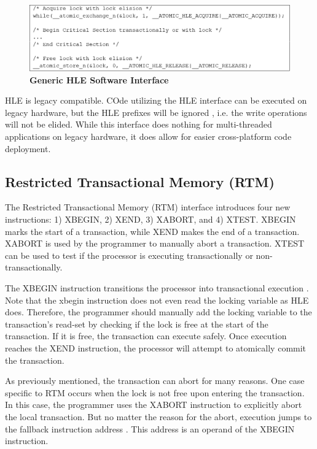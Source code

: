 \documentclass[a4paper]{article}
\begin{document}
\begin{figure}[H]
    \centering
    \graphicspath{ {./figures/} }
    \includegraphics[width=\textwidth,height=\textheight,keepaspectratio]{fig_hleInterface}
    \caption{\textbf{Generic HLE Software Interface}}
    \label{fig:hle_interface}
\end{figure}

\indent HLE is legacy compatible.  COde utilizing the HLE interface can be
executed on legacy hardware, but the HLE prefixes will be ignored
\cite{intel_prog_ref}, i.e. the write operations will not be elided.  While this
interface does nothing for multi-threaded applications on legacy hardware, it
does allow for easier cross-platform code deployment.\par

\subsection{\textbf{Restricted Transactional Memory (RTM)}}

\indent The Restricted Transactional Memory (RTM) interface introduces four new
instructions: 1) XBEGIN, 2) XEND, 3) XABORT, and 4) XTEST.  XBEGIN marks the
start of a transaction, while XEND makes the end of a transaction.  XABORT is
used by the programmer to manually abort a transaction.  XTEST can be used to
test if the processor is executing transactionally or non-transactionally.\par

\indent The XBEGIN instruction transitions the processor into transactional
execution \cite{intel_prog_ref}.  Note that the xbegin instruction does not even
read the locking variable as HLE does.  Therefore, the programmer should
manually add the locking variable to the transaction's read-set by checking if
the lock is free at the start of the transaction.  If it is free, the
transaction can execute safely.  Once execution reaches the XEND instruction,
the processor will attempt to atomically commit the transaction.\par

\indent As previously mentioned, the transaction can abort for many reasons.
One case specific to RTM occurs when the lock is not free upon entering the
transaction.  In this case, the programmer uses the XABORT instruction to
explicitly abort the local transaction.  But no matter the reason for the abort,
execution jumps to the fallback instruction address \cite{intel_prog_ref}.  This
address is an operand of the XBEGIN instruction.\par
\end{document}
